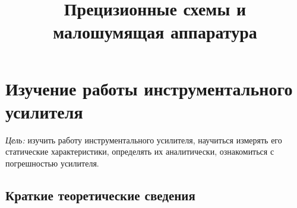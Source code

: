 \documentclass[a4paper,12pt]{article}
\title{Прецизионные схемы и малошумящая аппаратура}
\author{}
\begin{document}

\section{Изучение работы инструментального усилителя}

{\it Цель:} изучить работу инструментального усилителя, научиться измерять его статические характеристики, определять их аналитически, ознакомиться с погрешностью усилителя.
 
\subsection{Краткие теоретические сведения}
\end{document}
